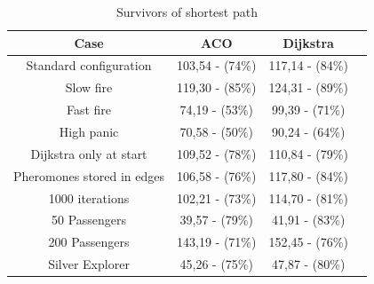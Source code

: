 \begin{table}[ht]
\caption{Survivors of shortest path} 				%
\centering										%
\begin{tabular}{c c c c}						%
\hline
\hline 											%
Case & ACO & Dijkstra \\[0.5ex]%
\hline											%
Standard configuration & 103,54 - (74\%) & 117,14 - (84\%)\\
Slow fire & 119,30 - (85\%) & 124,31 - (89\%) \\
Fast fire & 74,19 - (53\%) & 99,39 - (71\%) \\
High panic & 70,58 - (50\%) & 90,24 - (64\%) \\
Dijkstra only at start & 109,52 - (78\%) & 110,84 - (79\%) \\
Pheromones stored in edges & 106,58 - (76\%) & 117,80 - (84\%) \\
1000 iterations & 102,21 - (73\%) & 114,70 - (81\%) \\
50 Passengers & 39,57 - (79\%) & 41,91 - (83\%) \\ 
200 Passengers & 143,19 - (71\%) & 152,45 - (76\%) \\
Silver Explorer & 45,26 - (75\%) & 47,87 - (80\%) \\ [1ex]						%
\hline														%

\end{tabular}
\label{table:tableShortest}								
\end{table}